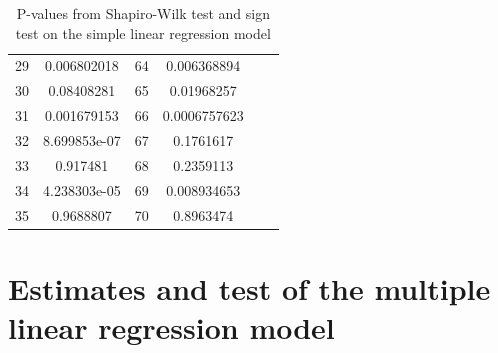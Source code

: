 \begin{table}
\begin{tabular}{c:cc|c:cc}
        29 & 0.006802018 & 64 & 0.006368894\\ 
        30 & 0.08408281 & 65 & 0.01968257\\ 
        31 & 0.001679153 & 66 & 0.0006757623\\ 
        32 & 8.699853e-07 & 67 & 0.1761617\\ 
        33 & 0.917481 & 68 & 0.2359113\\ 
        34 & 4.238303e-05 & 69 & 0.008934653 \\ 
        35 & 0.9688807 & 70 & 0.8963474\\
        \hline
    \end{tabular}
    \caption{P-values from Shapiro-Wilk test and sign test on the simple linear regression model}
    \label{tab: shapiro_simple_lm}
\end{table}

\section{Estimates and test of the multiple linear regression model}
